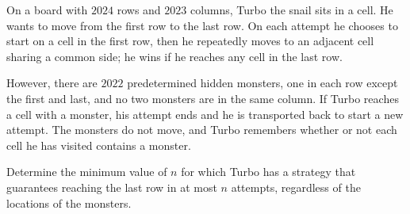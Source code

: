 On a board with $2024$ rows and $2023$ columns, Turbo the snail sits in a cell. He wants to move from the first row to the last row. On each attempt he chooses to start on a cell in the first row, then he repeatedly moves to an adjacent cell sharing a common side; he wins if he reaches any cell in the last row.

However, there are $2022$ predetermined hidden monsters, one in each row except the first and last, and no two monsters are in the same column. If Turbo reaches a cell with a monster, his attempt ends and he is transported back to start a new attempt. The monsters do not move, and Turbo remembers whether or not each cell he has visited contains a monster.

Determine the minimum value of $n$ for which Turbo has a strategy that guarantees reaching the last row in at most $n$ attempts, regardless of the locations of the monsters.
